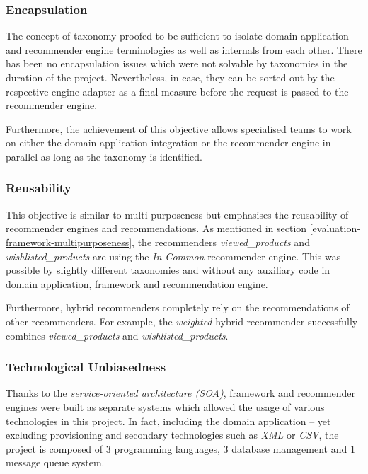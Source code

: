 \subsubsection{Encapsulation}

The concept of taxonomy proofed to be sufficient to isolate domain application and recommender engine terminologies as well as internals from each other. There has been no encapsulation issues which were not solvable by taxonomies in the duration of the project. Nevertheless, in case, they can be sorted out by the respective engine adapter as a final measure before the request is passed to the recommender engine.

Furthermore, the achievement of this objective allows specialised teams to work on either the domain application integration or the recommender engine in parallel as long as the taxonomy is identified.

\subsubsection{Reusability}

This objective is similar to multi-purposeness but emphasises the reusability of recommender engines and recommendations. As mentioned in section \ref{evaluation-framework-multipurposeness}, the recommenders \emph{viewed_products} and \emph{wishlisted_products} are using the \emph{In-Common} recommender engine. This was possible by slightly different taxonomies and without any auxiliary code in domain application, framework and recommendation engine.

Furthermore, hybrid recommenders completely rely on the recommendations of other recommenders. For example, the \emph{weighted} hybrid recommender successfully combines \emph{viewed_products} and \emph{wishlisted_products}.

\subsubsection{Technological Unbiasedness}

Thanks to the \emph{service-oriented architecture (SOA)}, framework and recommender engines were built as separate systems which allowed the usage of various technologies in this project. In fact, including the domain application -- yet excluding provisioning and secondary technologies such as \emph{XML} or \emph{CSV}, the project is composed of 3 programming languages, 3 database management and 1 message queue system.


